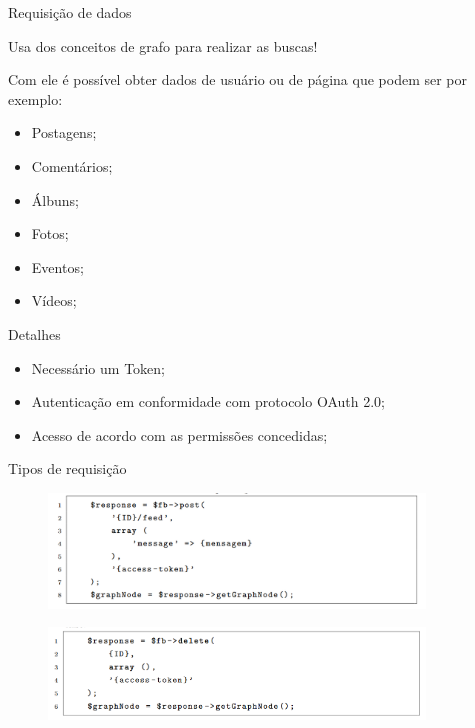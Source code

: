 \documentclass{aula-ifb}
\begin{document}
\begin{frame}{Requisição de dados}
\begin{center}
Usa dos conceitos de grafo para realizar as buscas!\\
\end{center}
Com ele é possível obter dados de usuário ou de página que podem ser por exemplo: 
\begin{itemize}
   \item Postagens;
   \item Comentários;
   \item Álbuns;
   \item Fotos;
   \item Eventos;
   \item Vídeos;
\end{itemize}
\end{frame}

\begin{frame}{Detalhes}
\begin{itemize}
   \item Necessário um Token;
   \item Autenticação em conformidade com protocolo OAuth 2.0;
   \item Acesso de acordo com as permissões concedidas;
\end{itemize}
\end{frame}

\begin{frame}{Tipos de requisição}
\begin{figure}[h]
\includegraphics[width=10cm]{figuras/requisicaopost.png}
\label{fig:facebookgraph}
\end{figure}
\begin{figure}[h]
\includegraphics[width=10cm]{figuras/requisicaodelete.png}
\label{fig:facebookgraph}
\end{figure}
\end{frame}
\end{document}
